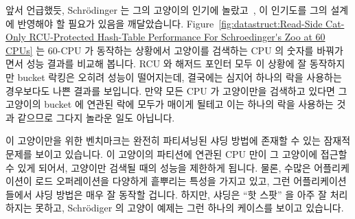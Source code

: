 앞서 언급했듯, Schr\"odinger 는 그의 고양이의 인기에
놀랐고~\cite{ErwinSchroedinger1935Cat}, 이 인기도를 그의 설계에 반영해야 할
필요가 있음을 깨달았습니다.
Figure~\ref{fig:datastruct:Read-Side Cat-Only RCU-Protected Hash-Table Performance For Schroedinger's Zoo at 60 CPUs}
는 60-CPU 가 동작하는 상황에서 고양이를 검색하는 CPU 의 숫자를 바꿔가면서 성능
결과를 비교해 봅니다.
RCU 와 해저드 포인터 모두 이 상황에 잘 동작하지만 bucket 락킹은 오히려 성능이
떨어지는데, 결국에는 심지어 하나의 락을 사용하는 경우보다도 나쁜 결과를
보입니다.
만약 모든 CPU 가 고양이만을 검색하고 있다면 그 고양이의 bucket 에 연관된 락에
모두가 매이게 될테고 이는 하나의 락을 사용하는 것과 같으므로 그다지 놀라운 일도
아닙니다.

이 고양이만을 위한 벤치마크는 완전히 파티셔닝된 샤딩 방법에 존재할 수 있는
잠재적 문제를 보이고 있습니다.
이 고양이의 파티션에 연관된 CPU 만이 그 고양이에 접근할 수 있게 되어서,
고양이만 검색될 때의 성능을 제한하게 됩니다.
물론, 수많은 어플리케이션이 로드 오퍼레이션을 다양하게 흩뿌리는 특성을 가지고
있고, 그런 어플리케이션들에서 샤딩 방법은 매우 잘 동작할 겁니다.
하지만, 샤딩은 ``핫 스팟'' 을 아주 잘 처리하지는 못하고, Schr\"odiger 의 고양이
예제는 그런 하나의 케이스를 보이고 있습니다.

